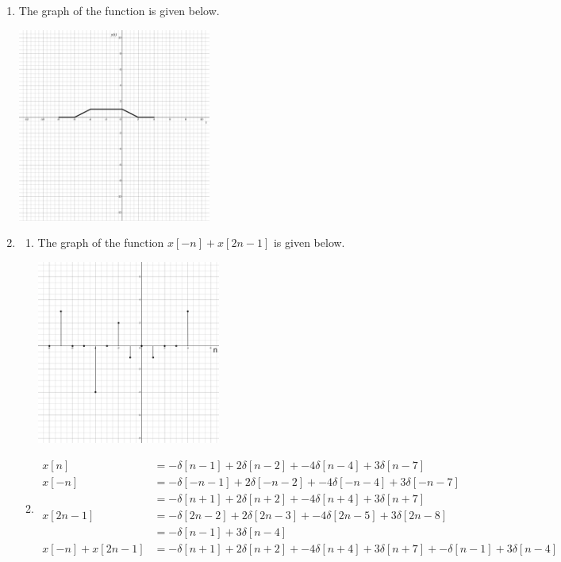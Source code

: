 \documentclass[10pt,a4paper, margin=1in]{article}
\begin{document}
\begin{enumerate}
\newpage %
\item %
    The graph of the function is given below.
    \begin{center}
        \includegraphics*[width=0.5\textwidth]{assets/graphs/q2.png}
    \end{center}

\item %
    \begin{enumerate}
    \item
        The graph of the function $x[-n] + x[2n - 1]$ is given below.
        \begin{center}
            \includegraphics*[width=0.5\textwidth]{assets/graphs/q3a.png}
        \end{center}
    \item \begin{align*}
        x[n] &=  -\delta[n-1] + 2\delta[n-2] + -4\delta[n-4] + 3\delta[n-7] \\
        x[-n] &= -\delta[-n-1] + 2\delta[-n-2] + -4\delta[-n-4] + 3\delta[-n-7] \\
        &= -\delta[n+1] + 2\delta[n+2] + -4\delta[n+4] + 3\delta[n+7] \\
        x[2n-1] &= -\delta[2n-2] + 2\delta[2n-3] + -4\delta[2n-5] + 3\delta[2n-8] \\
        &= -\delta[n-1] + 3\delta[n-4] \\
        x[-n] + x[2n-1] &= -\delta[n+1] + 2\delta[n+2] + -4\delta[n+4] + 3\delta[n+7] + -\delta[n-1] + 3\delta[n-4] \\
    \end{align*}
    

\end{enumerate}
\end{enumerate}
\end{document}
